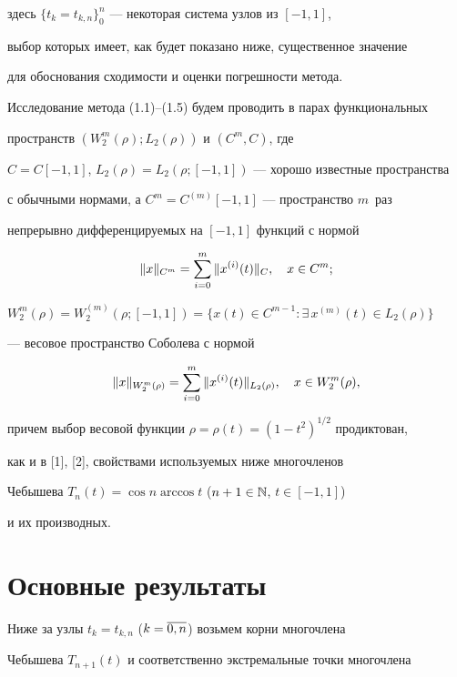 здесь $\{t_k=t_{k,n}\}_0^n$ --- некоторая система узлов из $[-1,1]$, 


выбор которых имеет, как будет показано ниже, существенное значение


для обоснования сходимости и оценки погрешности метода.





Исследование метода (1.1)--(1.5) будем проводить в парах функциональных 


пространств $(W_2^m(\rho); L_2(\rho))$ и $(C^m,C)$, где


$C=C[-1,1]$, $L_2(\rho)=L_2(\rho;[-1,1])$ --- хорошо известные пространства 


с обычными нормами, а $C^m = C^{(m)}[-1,1]$ --- пространство $m$~раз


непрерывно дифференцируемых на $[-1,1]$ функций с нормой


$$


\|x\|_{C^m}=\suml_{i=0}^m\|x^{(i)}(t)\|_C,\quad x\in C^m;


$$


$W_2^m(\rho) = W_2^{(m)}(\rho;[-1,1])=\{x(t)\in C^{m-1}:


\exists\, x^{(m)}(t)\in L_2(\rho)\}$


--- весовое пространство Соболева с нормой


$$


\|x\|_{W_2^m(\rho)} =


\suml_{i=0}^m \|x^{(i)}(t)\|_{L_2(\rho)},\quad x\in W_2^m(\rho),


$$


причем выбор весовой функции $\rho=\rho(t)=(1-t^2)^{1/2}$ продиктован, 


как и в [1], [2], свойствами используемых ниже многочленов


Чебышева $T_n(t) = \cos n \arccos t$ ($n+1\in \Bbb{N}$, $t\in [-1,1]$)


и их производных.








\section{Основные результаты}





Ниже за узлы $t_k = t_{k,n}$ ($k=\overline{0,n}$) возьмем корни многочлена 


Чебышева $T_{n+1}(t)$ и соответственно экстремальные точки многочлена


